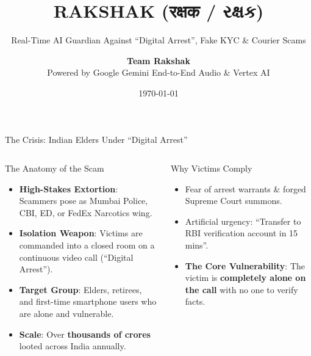 \documentclass[aspectratio=169,10pt]{beamer}
\title[\textbf{Rakshak}: AI Call Guardian]{\textbf{RAKSHAK (रक्षक / રક્ષક)}}
\subtitle{Real-Time AI Guardian Against ``Digital Arrest'', Fake KYC \& Courier Scams}
\author[Team Rakshak]{\textbf{Team Rakshak} \\ Powered by Google Gemini End-to-End Audio \& Vertex AI}
\institute[Hackathon 2026]{Indian Cyber Safety Initiative}
\date{\today}
\begin{document}
\begin{frame}
  \titlepage
\end{frame}

\begin{frame}{The Crisis: Indian Elders Under ``Digital Arrest''}
\begin{columns}[T]
\begin{block}{The Anatomy of the Scam}
\begin{itemize}
    \item \textbf{High-Stakes Extortion}: Scammers pose as Mumbai Police, CBI, ED, or FedEx Narcotics wing.
    \item \textbf{Isolation Weapon}: Victims are commanded into a closed room on a continuous video call (``Digital Arrest'').
    \item \textbf{Target Group}: Elders, retirees, and first-time smartphone users who are alone and vulnerable.
    \item \textbf{Scale}: Over \textbf{thousands of crores} looted across India annually.
\end{itemize}
\end{block}

\begin{alertblock}{Why Victims Comply}
\begin{itemize}
    \item Fear of arrest warrants \& forged Supreme Court summons.
    \item Artificial urgency: ``Transfer to RBI verification account in 15 mins''.
    \item \textbf{The Core Vulnerability}: The victim is \textbf{completely alone on the call} with no one to verify facts.
\end{itemize}
\end{alertblock}
\end{columns}
\end{frame}
\end{document}

